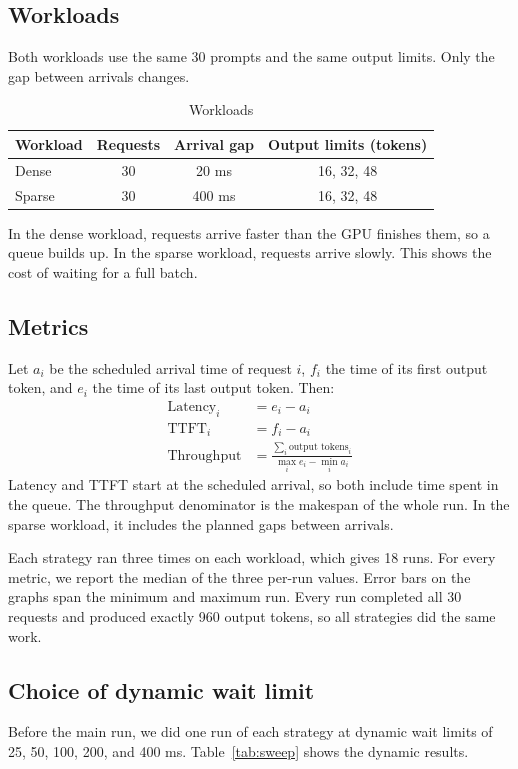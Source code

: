 \documentclass[12pt,a4paper]{article}
\begin{document}
\subsection{Workloads}
Both workloads use the same 30 prompts and the same output limits. Only the gap between arrivals changes.

\begin{table}[H]
\centering
\caption{Workloads}
\begin{tabular}{lccc}
\toprule
\textbf{Workload} & \textbf{Requests} & \textbf{Arrival gap} & \textbf{Output limits (tokens)} \\
\midrule
Dense & 30 & 20 ms & 16, 32, 48 \\
Sparse & 30 & 400 ms & 16, 32, 48 \\
\bottomrule
\end{tabular}
\end{table}

In the dense workload, requests arrive faster than the GPU finishes them, so a queue builds up. In the sparse workload, requests arrive slowly. This shows the cost of waiting for a full batch.

\subsection{Metrics}
Let $a_i$ be the scheduled arrival time of request $i$, $f_i$ the time of its first output token, and $e_i$ the time of its last output token. Then:
\begin{align*}
\text{Latency}_i &= e_i - a_i \\
\text{TTFT}_i &= f_i - a_i \\
\text{Throughput} &= \frac{\sum_i \text{output tokens}_i}{\max_i e_i - \min_i a_i}
\end{align*}
Latency and TTFT start at the scheduled arrival, so both include time spent in the queue. The throughput denominator is the makespan of the whole run. In the sparse workload, it includes the planned gaps between arrivals.

Each strategy ran three times on each workload, which gives 18 runs. For every metric, we report the median of the three per-run values. Error bars on the graphs span the minimum and maximum run. Every run completed all 30 requests and produced exactly 960 output tokens, so all strategies did the same work.

\subsection{Choice of dynamic wait limit}
Before the main run, we did one run of each strategy at dynamic wait limits of 25, 50, 100, 200, and 400 ms. Table~\ref{tab:sweep} shows the dynamic results.
\end{document}
